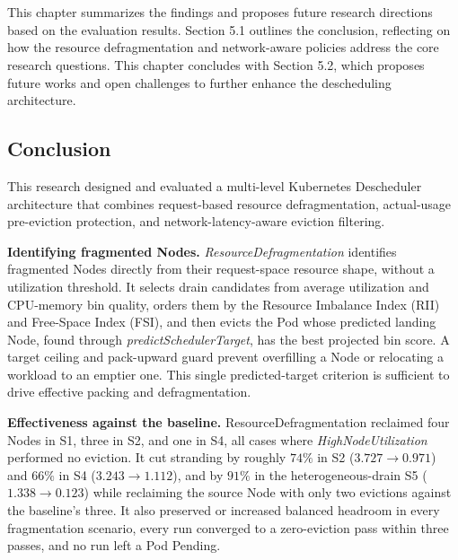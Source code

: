 \chapter{\babLima}
\label{bab:5}

This chapter summarizes the findings and proposes future research directions based on the evaluation results. Section 5.1 outlines the conclusion, reflecting on how the resource defragmentation and network-aware policies address the core research questions. This chapter concludes with Section 5.2, which proposes future works and open challenges to further enhance the descheduling architecture.

\section{Conclusion}
\label{sec:conclusion}

This research designed and evaluated a multi-level Kubernetes Descheduler architecture that combines request-based resource defragmentation, actual-usage pre-eviction protection, and network-latency-aware eviction filtering.

\textbf{Identifying fragmented Nodes.} \textit{ResourceDefragmentation} identifies fragmented Nodes directly from their request-space resource shape, without a utilization threshold. It selects drain candidates from average utilization and CPU-memory bin quality, orders them by the Resource Imbalance Index (RII) and Free-Space Index (FSI), and then evicts the Pod whose predicted landing Node, found through \textit{predictSchedulerTarget}, has the best projected bin score. A target ceiling and pack-upward guard prevent overfilling a Node or relocating a workload to an emptier one. This single predicted-target criterion is sufficient to drive effective packing and defragmentation.

\textbf{Effectiveness against the baseline.} ResourceDefragmentation reclaimed four Nodes in S1, three in S2, and one in S4, all cases where \textit{HighNodeUtilization} performed no eviction. It cut stranding by roughly \(74\%\) in S2 (\(3.727 \to 0.971\)) and \(66\%\) in S4 (\(3.243 \to 1.112\)), and by \(91\%\) in the heterogeneous-drain S5 (\(1.338 \to 0.123\)) while reclaiming the source Node with only two evictions against the baseline's three. It also preserved or increased balanced headroom in every fragmentation scenario, every run converged to a zero-eviction pass within three passes, and no run left a Pod Pending.

